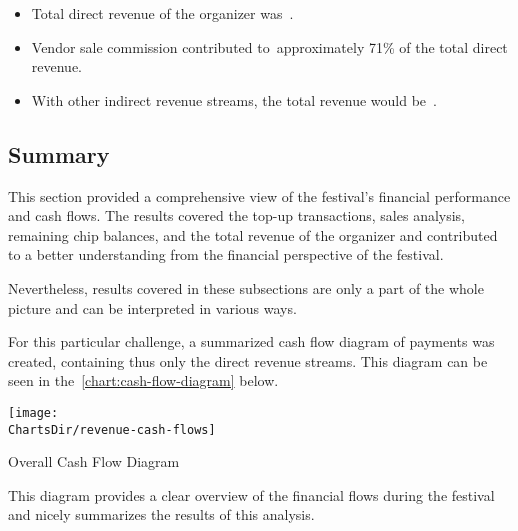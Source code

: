 \begin{keytakeaways}
	\begin{itemize}
		\item Total direct revenue of the organizer was~.
		\item Vendor sale commission contributed to~approximately 71\% of the total direct revenue.
		\item With other indirect revenue streams, the total revenue would be~.
	\end{itemize}
\end{keytakeaways}


\subsection{Summary}
\label{subsec:analysis-cashflow-summary}

This section provided a comprehensive view of the festival's financial performance and cash flows.
The results covered the top-up transactions, sales analysis, remaining chip balances, and the total revenue of the organizer and contributed to a better understanding from the financial perspective of the festival.

Nevertheless, results covered in these subsections are only a part of the whole picture and can be interpreted in various ways.

For this particular challenge, a summarized cash flow diagram of payments was created, containing thus only the direct revenue streams.
This diagram can be seen in the~\autoref{chart:cash-flow-diagram} below.

\begin{chart}[H]
	\centering
	\texttt{[image: \\ChartsDir/revenue-cash-flows]}
	\caption{Overall Cash Flow Diagram}
	\label{chart:cash-flow-diagram}
	\source
\end{chart}

This diagram provides a clear overview of the financial flows during the festival and nicely summarizes the results of this analysis.

